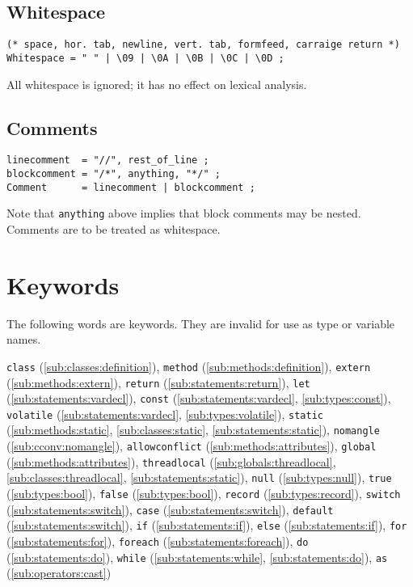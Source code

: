\documentclass{article}
\begin{document}
\subsection{Whitespace}
\label{sub:lexicals:whitespace}
\begin{verbatim}
(* space, hor. tab, newline, vert. tab, formfeed, carraige return *)
Whitespace = " " | \09 | \0A | \0B | \0C | \0D ;
\end{verbatim}
All whitespace is ignored; it has no effect on lexical analysis.

\subsection{Comments}
\label{sub:lexicals:comments}
\begin{verbatim}
linecomment  = "//", rest_of_line ;
blockcomment = "/*", anything, "*/" ;
Comment      = linecomment | blockcomment ;
\end{verbatim}
Note that \texttt{anything} above implies that block comments may be nested.
Comments are to be treated as whitespace.

\section{Keywords}
\label{sec:keywords}
The following words are keywords. They are invalid for use as type or variable
names.

\texttt{class} (\ref{sub:classes:definition}),
\texttt{method} (\ref{sub:methods:definition}),
\texttt{extern} (\ref{sub:methods:extern}),
\texttt{return} (\ref{sub:statements:return}),
\texttt{let} (\ref{sub:statements:vardecl}),
\texttt{const} (\ref{sub:statements:vardecl}, \ref{sub:types:const}),
\texttt{volatile} (\ref{sub:statements:vardecl}, \ref{sub:types:volatile}),
\texttt{static} (\ref{sub:methods:static}, \ref{sub:classes:static},
  \ref{sub:statements:static}),
\texttt{nomangle} (\ref{sub:cconv:nomangle}),
\texttt{allowconflict} (\ref{sub:methods:attributes}),
\texttt{global} (\ref{sub:methods:attributes}),
\texttt{threadlocal} (\ref{sub:globals:threadlocal},
                      \ref{sub:classes:threadlocal},
                      \ref{sub:statements:static}),
\texttt{null} (\ref{sub:types:null}),
\texttt{true} (\ref{sub:types:bool}),
\texttt{false} (\ref{sub:types:bool}),
\texttt{record} (\ref{sub:types:record}),
\texttt{switch} (\ref{sub:statements:switch}),
\texttt{case} (\ref{sub:statements:switch}),
\texttt{default} (\ref{sub:statements:switch}),
\texttt{if} (\ref{sub:statements:if}),
\texttt{else} (\ref{sub:statements:if}),
\texttt{for} (\ref{sub:statements:for}),
\texttt{foreach} (\ref{sub:statements:foreach}),
\texttt{do} (\ref{sub:statements:do}),
\texttt{while} (\ref{sub:statements:while}, \ref{sub:statements:do}),
\texttt{as} (\ref{sub:operators:cast})
\end{document}
